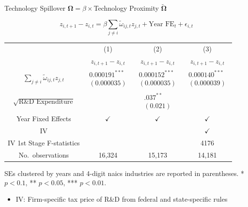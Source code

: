 \documentclass[
  aspectratio=169,  %
]{beamer}
\theoremstyle{plain}
\begin{document}
\begin{frame}{Technology Spillover $\symbf{\Omega}=\beta\times$Technology Proximity $\symbf{\widetilde{\Omega}}$ \hyperlink{first_stage}{}}
  
  {\footnotesize
  \vspace{-5mm}
  \label{regression}

  \[
    z_{i,t+1}-z_{i,t}
      =\beta\sum_{j\neq i}\tilde{\omega}_{ij,t}z_{j,t}
      +\text{Year FE}_{t}
      +\epsilon_{i,t}
  \]
  \begin{center}
    \setlength{\tabcolsep}{3pt}
    \begin{tabular}{cccc}
      \hline\hline
       & (1) & (2) & (3) \\ 
       & $z_{i,t+1}-z_{i,t}$ 
       & $z_{i,t+1}-z_{i,t}$ 
       & $z_{i,t+1}-z_{i,t}$ \\
      \hline
      $\sum_{j\neq i}\tilde{\omega}_{ij,t}z_{j,t}$
        & $\begin{array}{c}\text{0.000191}^{***}\\(\text{0.000035})\end{array}$
        & $\begin{array}{c}\text{0.000152}^{***}\\(\text{0.000035})\end{array}$
        & $\begin{array}{c}\text{0.000140}^{***}\\(\text{0.000039})\end{array}$ \\

      $\sqrt{\text{R\&D Expenditure}}$
        & 
        & $\begin{array}{c}\text{.037}^{**}\\(\text{0.021})\end{array}$
        &  \\

      \hline
      Year Fixed Effects                & $\checkmark$ & $\checkmark$ & $\checkmark$ \\
      IV                                &            &            & $\checkmark$ \\
      IV 1st Stage F-statistics        &            &            & 4176        \\
      No.\ observations                & 16,324     & 15,173     & 14,181      \\
      \hline
    \end{tabular}
  \end{center}

  SEs clustered by years and 4-digit naics industries are reported in parentheses. 
  {*} $p<\text{0.1}$, {**} $p<\text{0.05}$, {***} $p<\text{0.01}$.}
\begin{itemize}
  \item IV: Firm-specific tax price of R\&D from federal and state-specific rules \citep{Bloom2013-pn}
\end{itemize}
\end{frame}
\end{document}
